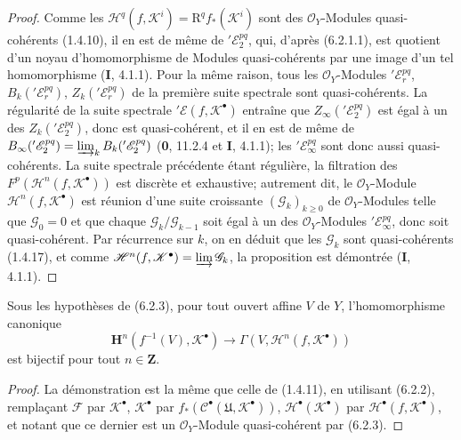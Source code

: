 \begin{proof}
Comme les $\mathscr H^q(f,\mathscr K^i)=\mathrm R^q f_*(\mathscr K^i)$ sont
des $\mathscr O_Y$-Modules quasi-cohérents (1.4.10), il en est de même de
$'\mathscr E_2^{pq}$, qui, d'après (6.2.1.1), est quotient d'un noyau
d'homomorphisme de Modules quasi-cohérents par une image d'un tel
homomorphisme (\textbf{I}, 4.1.1). Pour la même raison, tous les
$\mathscr O_Y$-Modules $'\mathscr E_r^{pq}$,
$B_k('\mathscr E_r^{pq})$, $Z_k('\mathscr E_r^{pq})$ de la première suite
spectrale sont quasi-cohérents. La régularité de la suite spectrale
$'\mathscr E(f,\mathscr K^\bullet)$ entraîne que
$Z_\infty('\mathscr E_2^{pq})$ est égal à un des
$Z_k('\mathscr E_2^{pq})$, donc est quasi-cohérent, et il en est de même de
$B_\infty('\mathscr E_2^{pq})=\varinjlim_k B_k('\mathscr E_2^{pq})$
(\textbf{0}, 11.2.4 et \textbf{I}, 4.1.1); les $'\mathscr E_\infty^{pq}$ sont donc aussi
quasi-cohérents. La suite spectrale précédente étant régulière, la filtration
des $F^p(\mathscr H^n(f,\mathscr K^\bullet))$ est discrète et exhaustive;
autrement dit, le $\mathscr O_Y$-Module
$\mathscr H^n(f,\mathscr K^\bullet)$ est réunion d'une suite croissante
$(\mathscr G_k)_{k\geq0}$ de $\mathscr O_Y$-Modules telle que
$\mathscr G_0=0$ et que chaque $\mathscr G_k/\mathscr G_{k-1}$ soit égal à un
des $\mathscr O_Y$-Modules $'\mathscr E_\infty^{pq}$, donc soit
quasi-cohérent. Par récurrence sur $k$, on en déduit que les $\mathscr G_k$
sont quasi-cohérents (1.4.17), et comme
$\mathscr H^n(f,\mathscr K^\bullet)=\varinjlim\mathscr G_k$, la proposition
est démontrée (\textbf{I}, 4.1.1).
\end{proof}


\begin{corollary}[6.2.4]
Sous les hypothèses de (6.2.3), pour tout ouvert affine $V$ de $Y$,
l'homomorphisme canonique
\[
  \mathbf H^n(f^{-1}(V),\mathscr K^\bullet)
  \longrightarrow
  \Gamma(V,\mathscr H^n(f,\mathscr K^\bullet))
  \tag{6.2.4.1}\label{III.6.2.4.1.fr}
\]
est bijectif pour tout $n\in\mathbf Z$.
\end{corollary}

\begin{proof}
La démonstration est la même que celle de (1.4.11), en utilisant (6.2.2),
remplaçant $\mathscr F$ par $\mathscr K^\bullet$,
$\mathscr K^\bullet$ par
$f_*(\mathscr C^\bullet(\mathfrak U,\mathscr K^\bullet))$,
$\mathscr H^\bullet(\mathscr K^\bullet)$ par
$\mathscr H^\bullet(f,\mathscr K^\bullet)$, et notant que ce dernier est un
$\mathscr O_Y$-Module quasi-cohérent par (6.2.3).
\end{proof}


